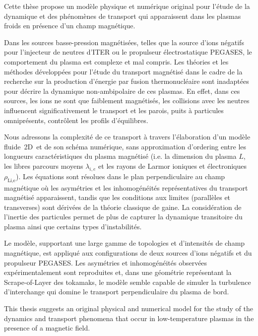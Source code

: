 \thispagestyle{preface}
Cette thèse propose un modèle physique et numérique original pour l'étude de la
dynamique et des phénomènes de transport qui apparaissent dans les plasmas
froids en présence d'un champ magnétique.
		
Dans les sources basse-pression magnétisées, telles que la source d'ions
négatifs pour l'injecteur de neutres d'ITER ou le propulseur électrostatique
PEGASES, le comportement du plasma est complexe et mal compris.
Les théories et les méthodes développées pour l'étude du transport magnétisé
dans le cadre de la recherche sur la production d'énergie par fusion
thermonucléaire sont inadaptées pour décrire la dynamique non-ambipolaire de ces
plasmas. En effet, dans ces sources, les ions ne sont que faiblement magnétisés,
les collisions avec les neutres influencent significativement le transport et
les parois, puits à particules omniprésents, contrôlent les profils
d'équilibres.
		
Nous adressons la complexité de ce transport à travers l’élaboration d'un modèle
fluide~2D\textonehalf ~et de son schéma numérique, sans approximation d'ordering
entre les longueurs caractéristiques du plasma magnétisé (i.e. la dimension du
plasma $L$, les libres parcours moyens $\lambda_{i,e}$ et les rayons
de Larmor ioniques et électroniques $\rho_\text{Li,e}$).
Les équations sont résolues dans le plan perpendiculaire au champ magnétique où
les asymétries et les inhomogénéités représentatives du transport magnétisé
apparaissent, tandis que les conditions aux limites (parallèles et transverses)
sont dérivées de la théorie classique de gaine. La considération de l'inertie
des particules permet de plus de capturer la dynamique transitoire du plasma
ainsi que certains types d'instabilités.
		
Le modèle, supportant une large gamme de topologies et d'intensités de champ
magnétique, est appliqué aux configurations de deux sources d'ions négatifs et
du propulseur PEGASES. Les asymétries et inhomogénéités observées
expérimentalement sont reproduites et, dans une géométrie représentant la
Scrape-of-Layer des tokamaks, le modèle semble capable de simuler la turbulence
d'interchange qui domine le transport perpendiculaire du plasma de bord.
\newpage
		\thispagestyle{empty}
\cleardoublepage
		\thispagestyle{preface}	
This thesis suggests an original physical and numerical model for the study of
the dynamics and transport phenomena that occur in low-temperature plasmas in
the presence of a magnetic field.

